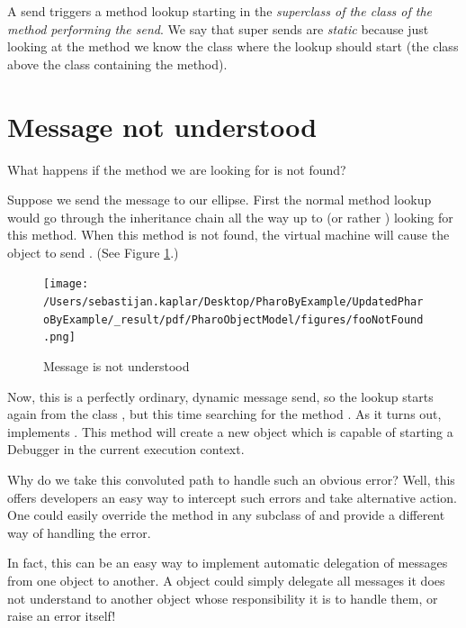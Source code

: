 \documentclass[10pt,twoside,english]{_support/latex/sbabook/sbabook}
\begin{document}
\begin{important}
A  send triggers a method lookup starting in the \textit{superclass of the class of the method performing the  send}. We say that super sends are \textit{static} because just looking at the method we know the class where the lookup should start (the class above the class containing the method).
\end{important}
\section{Message not understood}
What happens if the method we are looking for is not found?

Suppose we send the message  to our ellipse. First the normal method
lookup would go through the inheritance chain all the way up to  (or
rather ) looking for this method. When this method is not found,
the virtual machine will cause the object to send . (See Figure \ref{fig:fooNotFound}.)


\begin{figure}

\begin{center}
\texttt{[image: /Users/sebastijan.kaplar/Desktop/PharoByExample/UpdatedPharoByExample/\_result/pdf/PharoObjectModel/figures/fooNotFound.png]}\caption{Message  is not understood\label{fig:fooNotFound}}\end{center}
\end{figure}


Now, this is a perfectly ordinary, dynamic message send, so the lookup starts
again from the class , but this time searching for the method
. As it turns out,  implements
. This method will create a new 
object which is capable of starting a Debugger in the current execution context.

Why do we take this convoluted path to handle such an obvious error? Well, this
offers developers an easy way to intercept such errors and take alternative
action. One could easily override the method  in
any subclass of  and provide a different way of handling the error.

In fact, this can be an easy way to implement automatic delegation of messages
from one object to another. A  object could simply delegate all
messages it does not understand to another object whose responsibility it is to
handle them, or raise an error itself!
\end{document}

